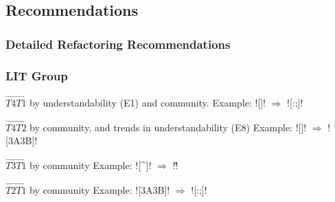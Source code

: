 \subsection{Recommendations}

{
\begin{frame}
\frametitle{Detailed Refactoring Recommendations}
\end{frame}
}
\note[itemize]{
    \item
}


\begin{frame}[fragile]
\frametitle{LIT Group}
\begin{block}{$\overrightarrow{T4 T1}$ by understandability (E1) and community.}
Example: \cverb![]! $\Rightarrow$ \cverb![:;]!
\end{block}

\begin{block}{$\overrightarrow{T4 T2}$ by community, and trends in understandability (E8) }
Example: \cverb![]! $\Rightarrow$ \cverb![\x3A\x3B]!
\end{block}

\begin{block}{$\overrightarrow{T3 T1}$ by community}
Example: \cverb![^]! $\Rightarrow$ \cverb!\^!
\end{block}

\begin{block}{$\overrightarrow{T2 T1}$ by community}
Example: \cverb![\x3A\x3B]! $\Rightarrow$ \cverb![:;]!
\end{block}
\end{frame}


